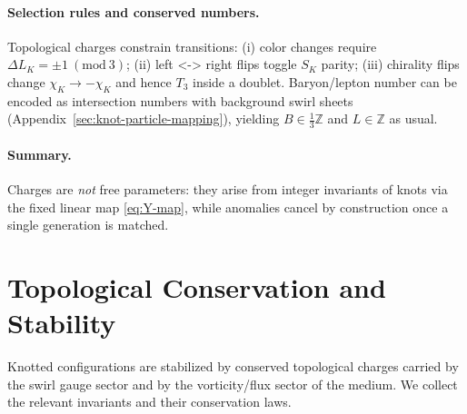\documentclass[11pt, preprint,titlepage]{revtex4-2}
\begin{document}
	\paragraph{Selection rules and conserved numbers.}
	Topological charges constrain transitions:
	(i) color changes require \(\Delta L_K=\pm1\ (\mathrm{mod}\ 3)\);
	(ii) left <-> right flips toggle \(S_K\) parity;
	(iii) chirality flips change \(\chi_K\to-\chi_K\) and hence \(T_3\) inside a doublet.
	Baryon/lepton number can be encoded as intersection numbers with background swirl sheets (Appendix~\ref{sec:knot-particle-mapping}), yielding \(B\in\tfrac{1}{3}\mathbb{Z}\) and \(L\in\mathbb{Z}\) as usual.

	\paragraph{Summary.}
	Charges are \emph{not} free parameters: they arise from integer invariants of knots via the fixed linear map \eqref{eq:Y-map}, while anomalies cancel by construction once a single generation is matched.

	\section{Topological Conservation and Stability}

	Knotted configurations are stabilized by conserved topological charges carried by the swirl gauge sector and by the vorticity/flux sector of the medium. We collect the relevant invariants and their conservation laws.
\end{document}
